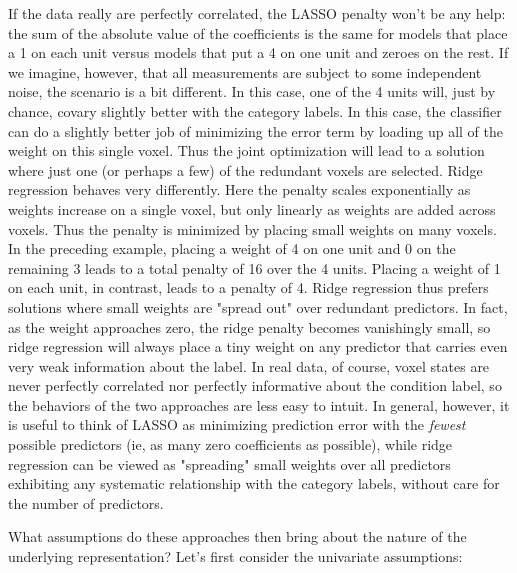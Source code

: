 If the data really are perfectly correlated, the LASSO penalty won't be any help: the sum of the absolute value of the coefficients is the same for models that place a 1 on each unit versus models that put a 4 on one unit and zeroes on the rest. If we imagine, however, that all measurements are subject to some independent noise, the scenario is a bit different. In this case, one of the 4 units will, just by chance, covary slightly better with the category labels. In this case, the classifier can do a slightly better job of minimizing the error term by loading up all of the weight on this single voxel. Thus the joint optimization will lead to a solution where just one (or perhaps a few) of the redundant voxels are selected. Ridge regression behaves very differently. Here the penalty scales exponentially as weights increase on a single voxel, but only linearly as weights are added across voxels. Thus the penalty is minimized by placing small weights on many voxels. In the preceding example, placing a weight of 4 on one unit and 0 on the remaining 3 leads to a total penalty of 16 over the 4 units. Placing a weight of 1 on each unit, in contrast, leads to a penalty of 4. Ridge regression thus prefers solutions where small weights are "spread out" over redundant predictors. In fact, as the weight approaches zero, the ridge penalty becomes vanishingly small, so ridge regression will always place a tiny weight on any predictor that carries even very weak information about the label. In real data, of course, voxel states are never perfectly correlated nor perfectly informative about the condition label, so the behaviors of the two approaches are less easy to intuit. In general, however, it is useful to think of LASSO as minimizing prediction error with the {\em fewest} possible predictors (ie, as many zero coefficients as possible), while ridge regression can be viewed as "spreading" small weights over all predictors exhibiting any systematic relationship with the category labels, without care for the number of predictors. 

What assumptions do these approaches then bring about the nature of the underlying representation? Let's first consider the univariate assumptions: 

